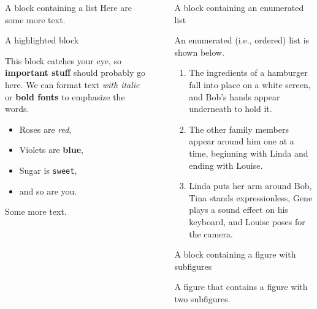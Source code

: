 \documentclass[final]{beamer}
\newlength{\sepwidth}
\newlength{\colwidth}
\newcommand{\separatorcolumn}{\begin{column}{\sepwidth}\end{column}}
\begin{document}
\begin{frame}[t]
\begin{columns}[t]
\begin{column}{\colwidth}
\begin{block}{A block containing a list}
    Here are some more text.

  \end{block}

  \begin{alertblock}{A highlighted block}

    This block catches your eye, so \textbf{important stuff} should probably go here.
    We can format text \textit{with italic} or \textbf{bold fonts} to emphasize the words.

    \begin{itemize}
      \item Roses are \textit{red},
      \item Violets are \textbf{blue},
      \item Sugar is \texttt{sweet},
      \item and so are you.
    \end{itemize}

    Some more text.

  \end{alertblock}

\end{column}

\separatorcolumn

\begin{column}{\colwidth}

  \begin{block}{A block containing an enumerated list}

    An enumerated (i.e., ordered) list is shown below. 

    \begin{enumerate}
      \item The ingredients of a hamburger fall into place on a white screen, and Bob's hands appear underneath to hold it.
      \item The other family members appear around him one at a time, beginning with Linda and ending with Louise.
      \item Linda puts her arm around Bob, Tina stands expressionless, Gene plays a sound effect on his keyboard, and Louise poses for the camera.
    \end{enumerate}


  \end{block}

  \begin{block}{A block containing a figure with subfigures}

    A figure that contains a figure with two subfigures.


\end{block}
\end{column}
\end{columns}
\end{frame}
\end{document}

